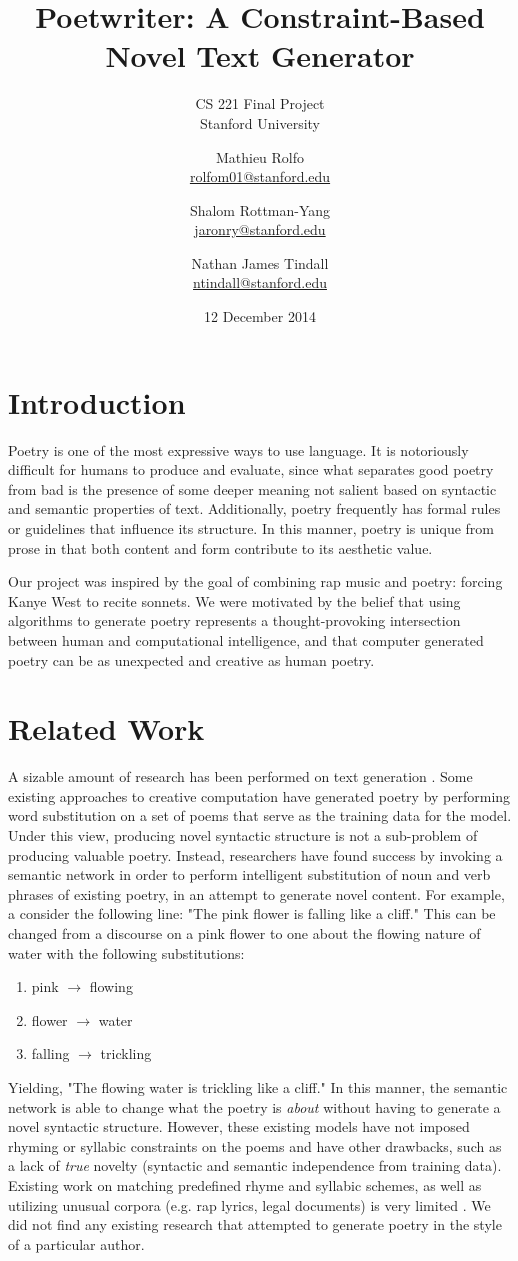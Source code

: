 \documentclass[10pt,twocolumn]{article}
\title{\textbf{Poetwriter}: A Constraint-Based Novel Text Generator}
\subtitle{
	CS 221 Final Project\\
	Stanford University
	}
\author{
	Mathieu Rolfo\\
	\href{mailto:rolfom01@stanford.edu}{rolfom01@stanford.edu}
  \and
  	Shalom Rottman-Yang\\
	\href{mailto:jaronry@stanford.edu}{jaronry@stanford.edu}
  \and
  	Nathan James Tindall\\
	\href{mailto:ntindall@stanford.edu}{ntindall@stanford.edu}
}
\date{12 December 2014}
\begin{document}
\maketitle

\section{Introduction}
Poetry is one of the most expressive ways to use language. It is notoriously difficult for humans to produce and evaluate, since what separates good poetry from bad is the presence of some deeper meaning not salient based on syntactic and semantic properties of text. Additionally, poetry frequently has formal rules or guidelines that influence its structure. In this manner, poetry is unique from prose in that both content and form contribute to its aesthetic value. 

Our project was inspired by the goal of combining rap music and poetry: forcing Kanye West to recite sonnets. We were motivated by the belief that using algorithms to generate poetry represents a thought-provoking intersection between human and computational intelligence, and that computer generated poetry can be as unexpected and creative as human poetry.

\section{Related Work}
A sizable amount of research has been performed on text generation \cite{bot,Kurzweil,Toivanen}. Some existing approaches to creative computation have generated poetry by performing word substitution on a set of poems that serve as the training data for the model. Under this view, producing novel syntactic structure is not a sub-problem of producing valuable poetry. Instead, researchers have found success by invoking a semantic network in order to perform intelligent substitution of noun and verb phrases of existing poetry, in an attempt to generate novel content. For example, a consider the following line: "The pink flower is falling like a cliff." This can be changed from a discourse on a pink flower to one about the flowing nature of water with the following substitutions: 
\begin{enumerate} \item pink $\rightarrow$ flowing
\item flower $\rightarrow$ water
\item falling $\rightarrow$ trickling
\end{enumerate}
Yielding, "The flowing water is trickling like a cliff." In this manner, the semantic network is able to change what the poetry is \emph{about} without having to generate a novel syntactic structure. However, these existing models have not imposed rhyming or syllabic constraints on the poems and have other drawbacks, such as a lack of \emph{true} novelty (syntactic and semantic independence from training data)\cite{Toivanen}. Existing work on matching predefined rhyme and syllabic schemes, as well as utilizing unusual corpora (e.g. rap lyrics, legal documents) is very limited \cite{seuss}. We did not find any existing research that attempted to generate poetry in the style of a particular author. 
\end{document}
